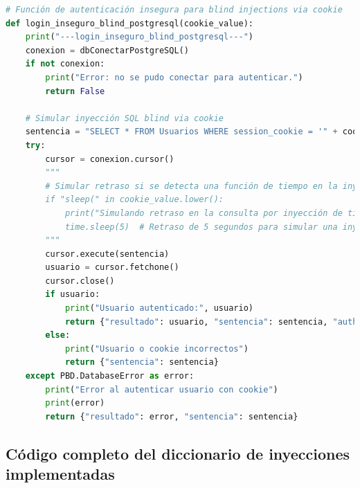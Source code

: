 \documentclass[a4paper,12pt]{article}
\begin{document}
\begin{lstlisting}[language=Python]
# Función de autenticación insegura para blind injections via cookie
def login_inseguro_blind_postgresql(cookie_value):
    print("---login_inseguro_blind_postgresql---")
    conexion = dbConectarPostgreSQL()
    if not conexion:
        print("Error: no se pudo conectar para autenticar.")
        return False

    # Simular inyección SQL blind via cookie
    sentencia = "SELECT * FROM Usuarios WHERE session_cookie = '" + cookie_value + "'"
    try:
        cursor = conexion.cursor()
        """
        # Simular retraso si se detecta una función de tiempo en la inyección
        if "sleep(" in cookie_value.lower():
            print("Simulando retraso en la consulta por inyección de tiempo")
            time.sleep(5)  # Retraso de 5 segundos para simular una inyección de tiempo
        """
        cursor.execute(sentencia)
        usuario = cursor.fetchone()
        cursor.close()
        if usuario:
            print("Usuario autenticado:", usuario)
            return {"resultado": usuario, "sentencia": sentencia, "auth": "true"}
        else:
            print("Usuario o cookie incorrectos")
            return {"sentencia": sentencia}
    except PBD.DatabaseError as error:
        print("Error al autenticar usuario con cookie")
        print(error)
        return {"resultado": error, "sentencia": sentencia}
\end{lstlisting}

\subsection{Código completo del diccionario de inyecciones implementadas}
\end{document}
